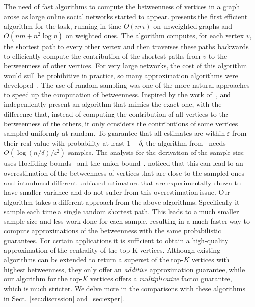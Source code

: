 The need of fast algorithms to compute the betweenness of vertices in a graph
arose as large online social networks started to appear. \citet{Brandes01} presents the
first efficient algorithm for the task, running in time $O(nm)$ on
unweighted graphs and $O(nm+n^2\log n)$ on weighted ones. The
algorithm computes, for each vertex $v$, the shortest path to every other vertex
and then traverses these paths backwards to efficiently compute the contribution
of the shortest paths from $v$ to the betweenness of other vertices. For very
large networks, the cost of this algorithm would still be prohibitive in
practice, so many approximation algorithms were
developed~\citep{JacobKLPT05,BrandesP07,BaderKMM07,GeisbergerSS08,MaiyaBW10,LimMRTB11}.
The use of random sampling was one of the more natural approaches to speed up
the computation of betweenness. Inspired by the work of~\citet{EppsteinW04},
\citet{JacobKLPT05} and independently \citet{BrandesP07} present an algorithm
that mimics the exact one, with the difference that,
instead of computing the contribution of all vertices to the betweenness of the
others, it only considers the contributions of some vertices sampled uniformly
at random. To guarantee that all estimates are within $\varepsilon$ from their
real value with probability at least $1-\delta$, the algorithm
from~\citep{JacobKLPT05,BrandesP07} needs $O(\log(n/\delta)/\varepsilon^2)$
samples. The analysis for the derivation of the sample size uses Hoeffding bounds~\citep{Hoeffding63} 
and the union bound~\citep{MitzenmacherU05}. 
\citet{GeisbergerSS08} noticed that this can lead
to an overestimation of the betweenness of vertices that are close to the
sampled ones and introduced different unbiased estimators that are
experimentally shown to have smaller variance and do not suffer from this
overestimation issue. Our algorithm takes a different approach from the above
algorithms. Specifically
it sample each time a single random shortest path. %
This leads to a much smaller sample size and less work done for each sample,
resulting in a much faster way to compute approximations of the betweenness with
the same probabilistic guarantees. 
\ifproof
For certain applications it is sufficient to obtain a high-quality approximation
of the centrality of the top-K vertices. Although existing algorithms
\citep{BrandesP07,JacobKLPT05,GeisbergerSS08} can be extended to return a
superset of the top-$K$ vertices with highest betweenness, they only offer an
\emph{additive} approximation guarantee, while our algorithm for the top-$K$
vertices offers a \emph{multiplicative} factor guarantee, which is much
stricter. 
\fi
We delve more in the comparisons with these algorithms in
Sect.~\ref{sec:discussion} and~\ref{sec:exper}. 

